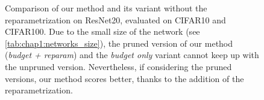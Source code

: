 \begin{figure}
  \centering
  \caption{Comparison of our method and its variant without the
  reparametrization on ResNet20, evaluated on CIFAR10 and CIFAR100. Due to the
  small size of the network (see \cref{tab:chap1:networks_size}), the pruned
  version of our method (\emph{budget + reparam}) and the \emph{budget only}
  variant cannot keep up with the unpruned version. Nevertheless, if considering
  the pruned versions, our method scores better, thanks to the addition of the
  reparametrization.}
  \label{fig:chap1:budget_only_resnet20}
\end{figure}

